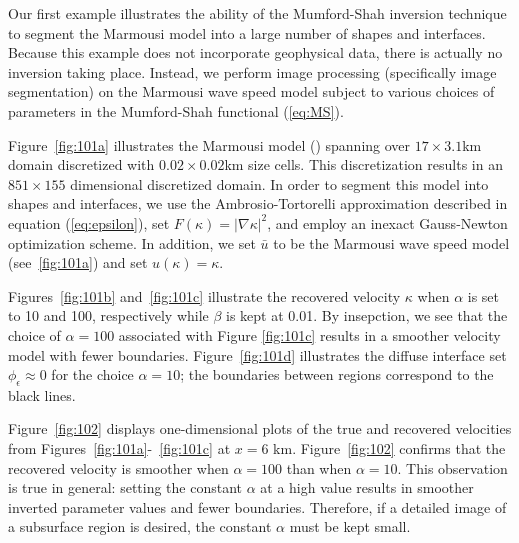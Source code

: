\documentclass[manuscript,revised]{geophysics}
\begin{document}
Our first example illustrates the ability of the Mumford-Shah inversion technique to segment the Marmousi model into a large number of shapes and interfaces.  Because this example does not incorporate geophysical data, there is actually no inversion taking place.  Instead, we perform image processing (specifically image segmentation) on the Marmousi wave speed model subject to various choices of parameters in the Mumford-Shah functional  (\ref{eq:MS}).

Figure~\ref{fig:101a} illustrates the Marmousi model (\cite{Marmousi2}) spanning over $17\times3.1$km domain discretized with $0.02\times0.02$km size cells. This discretization results in an $851\times155$ dimensional discretized domain. In order to segment this model into shapes and interfaces, we use the Ambrosio-Tortorelli approximation described in equation (\ref{eq:epsilon}), set $F(\kappa)=\left\vert \nabla \kappa \right\vert^2$, and employ an inexact Gauss-Newton optimization scheme.  In addition, we set $\bar{u}$ to be the Marmousi wave speed model (see~\ref{fig:101a}) and set $u(\kappa)=\kappa$. 

Figures~\ref{fig:101b} and~\ref{fig:101c} illustrate the recovered velocity $\kappa$ when $\alpha$ is set to 10 and 100, respectively while $\beta$ is kept at 0.01. By insepction, we see that the choice of $\alpha = 100$ associated with Figure \ref{fig:101c} results in a smoother velocity model with fewer boundaries. Figure~\ref{fig:101d} illustrates the diffuse interface set $\phi_\epsilon \approx 0$ for the choice $\alpha = 10$; the boundaries between regions correspond to the black lines.

Figure~\ref{fig:102} displays one-dimensional plots of the true and recovered velocities from Figures~\ref{fig:101a}-~\ref{fig:101c} at $x = 6$ km. Figure~\ref{fig:102} confirms that the recovered velocity is smoother when $\alpha = 100$ than when $\alpha = 10$. This observation is true in general: setting the constant $\alpha$ at a high value results in smoother inverted parameter values and fewer boundaries. Therefore, if a detailed image of a subsurface region is desired, the constant $\alpha$ must be kept small. 
\end{document}
